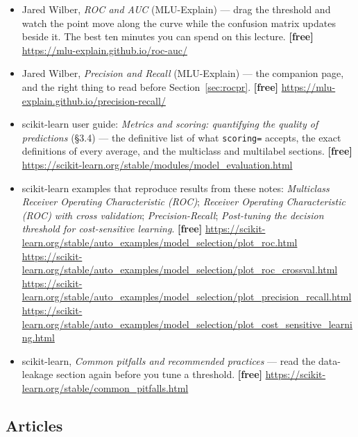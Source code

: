 \documentclass[11pt]{article}
\begin{document}
\begin{itemize}[leftmargin=*]
  \item Jared Wilber, \emph{ROC and AUC} (MLU-Explain) --- drag the threshold
    and watch the point move along the curve while the confusion matrix updates
    beside it. The best ten minutes you can spend on this lecture.
    \textbf{[free]} \url{https://mlu-explain.github.io/roc-auc/}
  \item Jared Wilber, \emph{Precision and Recall} (MLU-Explain) --- the
    companion page, and the right thing to read before
    Section~\ref{sec:rocpr}. \textbf{[free]}
    \url{https://mlu-explain.github.io/precision-recall/}
  \item scikit-learn user guide: \emph{Metrics and scoring: quantifying the
    quality of predictions} (\S3.4) --- the definitive list of what
    \texttt{scoring=} accepts, the exact definitions of every average, and the
    multiclass and multilabel sections. \textbf{[free]}
    \url{https://scikit-learn.org/stable/modules/model_evaluation.html}
  \item scikit-learn examples that reproduce results from these notes:
    \emph{Multiclass Receiver Operating Characteristic (ROC)}; \emph{Receiver
    Operating Characteristic (ROC) with cross validation}; \emph{Precision-Recall};
    \emph{Post-tuning the decision threshold for cost-sensitive learning}.
    \textbf{[free]}
    \url{https://scikit-learn.org/stable/auto_examples/model_selection/plot_roc.html}
    \\
    \url{https://scikit-learn.org/stable/auto_examples/model_selection/plot_roc_crossval.html}
    \\
    \url{https://scikit-learn.org/stable/auto_examples/model_selection/plot_precision_recall.html}
    \\
    \url{https://scikit-learn.org/stable/auto_examples/model_selection/plot_cost_sensitive_learning.html}
  \item scikit-learn, \emph{Common pitfalls and recommended practices} --- read
    the data-leakage section again before you tune a threshold. \textbf{[free]}
    \url{https://scikit-learn.org/stable/common_pitfalls.html}
\end{itemize}

\subsection*{Articles}
\end{document}
